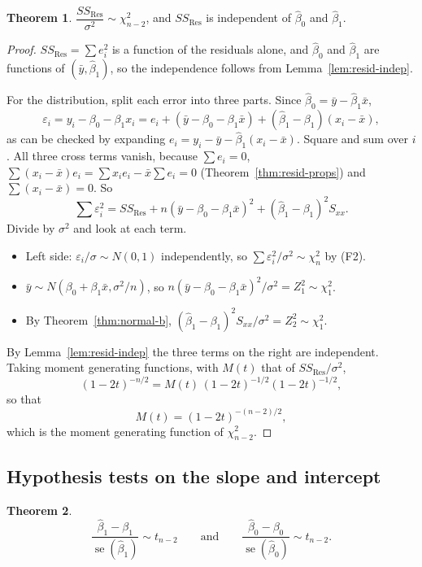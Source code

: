 \documentclass[11pt,a4paper]{article}
\numberwithin{equation}{section}
\theoremstyle{definition}
\newtheorem{thm}{Theorem}[subsection]
\begin{document}
\begin{thm}\label{thm:chisq}
$\dfrac{SS_{\mathrm{Res}}}{\sigma^2} \sim \chi^2_{n-2}$, and $SS_{\mathrm{Res}}$ is independent
of $\hat\beta_0$ and $\hat\beta_1$.
\end{thm}

\begin{proof}
$SS_{\mathrm{Res}} = \sum e_i^2$ is a function of the residuals alone, and $\hat\beta_0$ and
$\hat\beta_1$ are functions of $(\bar y, \hat\beta_1)$, so the independence follows from
Lemma~\ref{lem:resid-indep}.

For the distribution, split each error into three parts. Since
$\hat\beta_0 = \bar y - \hat\beta_1 \bar x$,
\[
\varepsilon_i = y_i - \beta_0 - \beta_1 x_i
= e_i + (\bar y - \beta_0 - \beta_1 \bar x) + (\hat\beta_1 - \beta_1)(x_i - \bar x) ,
\]
as can be checked by expanding $e_i = y_i - \bar y - \hat\beta_1(x_i - \bar x)$. Square
and sum over $i$. All three cross terms vanish, because $\sum e_i = 0$,
$\sum (x_i - \bar x) e_i = \sum x_i e_i - \bar x \sum e_i = 0$ (Theorem~\ref{thm:resid-props})
and $\sum (x_i - \bar x) = 0$. So
\[
\sum \varepsilon_i^2 = SS_{\mathrm{Res}} + n(\bar y - \beta_0 - \beta_1 \bar x)^2 + (\hat\beta_1 - \beta_1)^2 S_{xx} .
\]
Divide by $\sigma^2$ and look at each term.
\begin{itemize}
\item Left side: $\varepsilon_i/\sigma \sim N(0,1)$ independently, so $\sum \varepsilon_i^2/\sigma^2 \sim \chi^2_n$ by (F2).
\item $\bar y \sim N(\beta_0 + \beta_1 \bar x, \sigma^2/n)$, so $n(\bar y - \beta_0 - \beta_1 \bar x)^2/\sigma^2 = Z_1^2 \sim \chi^2_1$.
\item By Theorem~\ref{thm:normal-b}, $(\hat\beta_1 - \beta_1)^2 S_{xx}/\sigma^2 = Z_2^2 \sim \chi^2_1$.
\end{itemize}
By Lemma~\ref{lem:resid-indep} the three terms on the right are independent. Taking moment
generating functions, with $M(t)$ that of $SS_{\mathrm{Res}}/\sigma^2$,
\[
(1 - 2t)^{-n/2} = M(t)\,(1 - 2t)^{-1/2}(1 - 2t)^{-1/2},
\]
so that
\[
M(t) = (1 - 2t)^{-(n-2)/2},
\]
which is the moment generating function of $\chi^2_{n-2}$.
\end{proof}

\subsection{Hypothesis tests on the slope and intercept}\label{ssec:tests}
\begin{thm}\label{thm:t-slope}
\[
\frac{\hat\beta_1 - \beta_1}{\operatorname{se}(\hat\beta_1)} \sim t_{n-2}
\qquad\text{and}\qquad
\frac{\hat\beta_0 - \beta_0}{\operatorname{se}(\hat\beta_0)} \sim t_{n-2} .
\]
\end{thm}
\end{document}
